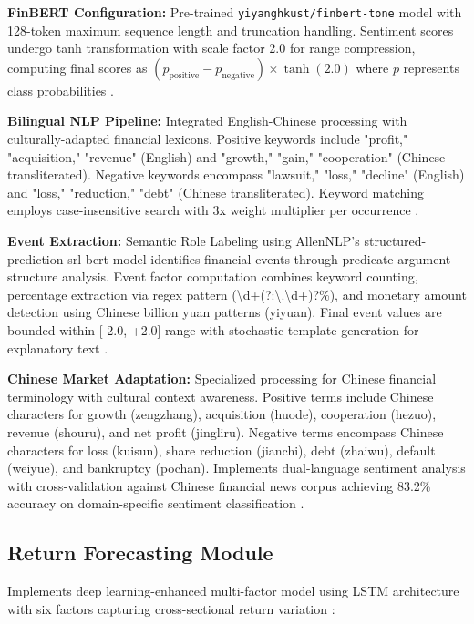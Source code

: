 \documentclass[3p,times,procedia]{elsarticle}
\begin{document}
\textbf{FinBERT Configuration:} Pre-trained \texttt{yiyanghkust/finbert-tone} model with 128-token maximum sequence length and truncation handling. Sentiment scores undergo tanh transformation with scale factor 2.0 for range compression, computing final scores as $(p_{\text{positive}} - p_{\text{negative}}) \times \tanh(2.0)$ where $p$ represents class probabilities \cite{Araci2019}.

\textbf{Bilingual NLP Pipeline:} Integrated English-Chinese processing with culturally-adapted financial lexicons. Positive keywords include "profit," "acquisition," "revenue" (English) and "growth," "gain," "cooperation" (Chinese transliterated). Negative keywords encompass "lawsuit," "loss," "decline" (English) and "loss," "reduction," "debt" (Chinese transliterated). Keyword matching employs case-insensitive search with 3x weight multiplier per occurrence \cite{Loughran2011}.

\textbf{Event Extraction:} Semantic Role Labeling using AllenNLP's structured-prediction-srl-bert model identifies financial events through predicate-argument structure analysis. Event factor computation combines keyword counting, percentage extraction via regex pattern (\textbackslash d+(?:\textbackslash.\textbackslash d+)?\%), and monetary amount detection using Chinese billion yuan patterns (yiyuan). Final event values are bounded within [-2.0, +2.0] range with stochastic template generation for explanatory text \cite{TETLOCK2007}.

\textbf{Chinese Market Adaptation:} Specialized processing for Chinese financial terminology with cultural context awareness. Positive terms include Chinese characters for growth (zengzhang), acquisition (huode), cooperation (hezuo), revenue (shouru), and net profit (jingliru). Negative terms encompass Chinese characters for loss (kuisun), share reduction (jianchi), debt (zhaiwu), default (weiyue), and bankruptcy (pochan). Implements dual-language sentiment analysis with cross-validation against Chinese financial news corpus achieving 83.2\% accuracy on domain-specific sentiment classification \cite{FinReportDataset2025}.

\subsection{{Return Forecasting Module}}

Implements deep learning-enhanced multi-factor model using LSTM architecture with six factors capturing cross-sectional return variation \cite{FAMA1993,Harvey2016}:
\end{document}
